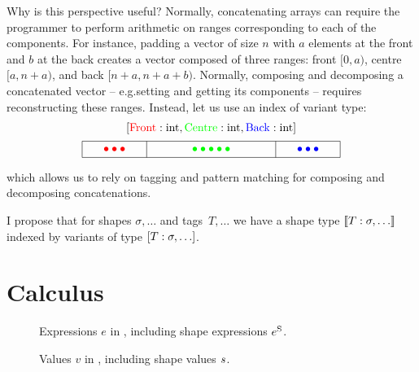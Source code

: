 Why is this perspective useful? Normally, concatenating arrays can require the programmer to perform arithmetic on ranges corresponding to each of the components. For instance, padding a vector of size $n$ with $a$ elements at the front and $b$ at the back creates a vector composed of three ranges: front $[0, a)$, centre $[a, n + a)$, and back $[n + a, n + a + b)$. Normally, composing and decomposing a concatenated vector -- e.g.\@ setting and getting its components -- requires reconstructing these ranges. Instead, let us use an index of variant type:
$$ \begin{array}{c}
\svarianttype{{\color{red} \mathrm{Front}} : \sint, {\color{green} \mathrm{Centre}} : \sint, {\color{blue} \mathrm{Back}} : \sint} \\[0.5em] \begin{tikzpicture}
    \draw (0, 0) -- (8, 0);
    \draw (0, .5) -- (8, .5);
    \draw (0, 0) -- (0, .5);
    \draw (8, 0) -- (8, .5);
    \node[color=red] at (1, .25) {$\bullet\bullet\bullet$};
    \draw (2, 0) -- (2, .5);
    \node[color=green] at (4, .25) {$\bullet\bullet\bullet\bullet\bullet$};
    \draw (6, 0) -- (6, .5);
    \node[color=blue] at (7, .25) {$\bullet\bullet\bullet$};
\end{tikzpicture} 
\end{array} $$
which allows us to rely on tagging and pattern matching for composing and decomposing concatenations.

I propose that for shapes $\sigma, \dots$ and tags~$T, \dots$ we have a shape type $\sconcattype{T : \sigma, \dots}$ indexed by variants of type $\svarianttype{T : \sigma, \dots}$.

\section{Calculus}
\label{sec:calculus}

\begin{figure}
    \centering
    
    \caption{Expressions $e$ in \starr{}, including shape expressions ${e^\mathrm{S}}$.}
    \label{fig:star-expressions}
\end{figure}

\begin{figure}
    \centering
    
    \caption{Values $v$ in \starr{}, including shape values $s$.}
    \label{fig:star-values}
\end{figure}

